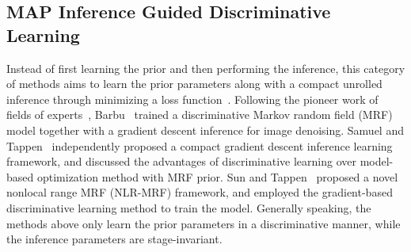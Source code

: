 \documentclass[journal]{IEEEtran}
\begin{document}
\vspace{-0.2cm}
\subsection{MAP Inference Guided Discriminative Learning}
Instead of first learning the prior and then performing the inference, this category of methods aims to learn the prior parameters along with a compact unrolled inference through minimizing a loss function~\cite{barbu2009training}.
Following the pioneer work of fields of experts~\cite{roth2005fields}, Barbu~\cite{barbu2009training} trained a discriminative Markov random field (MRF) model together with a gradient descent inference for image denoising. Samuel and Tappen~\cite{samuel2009learning} independently proposed a compact gradient descent inference learning framework, and discussed the advantages of discriminative learning over model-based optimization method with MRF prior. Sun and Tappen~\cite{sun2011learning} proposed a novel nonlocal range MRF (NLR-MRF) framework, and employed the gradient-based discriminative learning method to train the model. Generally speaking, the methods above only learn the prior parameters in a discriminative manner, while the inference parameters are stage-invariant.
\end{document}
